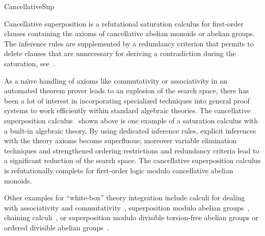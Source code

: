\begin{entry}{CancellativeSup}
\begin{clarifications}
Cancellative superposition is a refutational saturation calculus for
first-order clauses containing the axioms of
cancellative abelian monoids or abelian groups.
The inference rules are supplemented by a redundancy criterion
that permits to delete clauses that are unnecessary for
deriving a contradiction during the saturation, see~.
\end{clarifications}

\begin{history}
As a na{\"\i}ve handling of axioms like commutativity or associativity
in an automated theorem prover
leads to an explosion of the search space,
there has been a lot of interest in
incorporating specialized techniques into general proof systems
to work efficiently within standard algebraic theories.
The cancellative superposition calculus~\cite{GanzingerWaldmann1996CADE}
shown above
is one example of a saturation calculus with a built-in algebraic theory.
By using dedicated inference rules,
explicit inferences with the theory axioms become superfluous;
moreover variable elimination techniques
and strengthened ordering restrictions and redundancy criteria
lead to a significant reduction of the search space.
The cancellative superposition calculus is refutationally complete for
first-order logic modulo cancellative abelian monoids.

Other examples for ``white-box'' theory integration include
calculi for dealing with associativity and
commutativity~\cite{Plotkin1972,Slagle1974JACM,RusinowitchVigneron1995,BachmairGanzinger1994CTRS},
superposition modulo abelian groups~\cite{GodoyNieuwenhuis2004},
chaining calculi~\cite{Slagle1972JACM,Hines1992JAR,BachmairGanzinger1994LICS,BachmairGanzinger1994CADE},
or superposition modulo
divisible torsion-free abelian groups
or ordered divisible abelian groups~\cite{Waldmann2002abJSC,Waldmann2001IJCAR}.

\end{history}


\end{entry}
